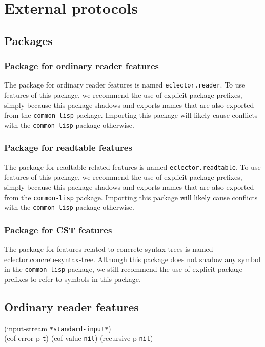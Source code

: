 \chapter{External protocols}

\section{Packages}

\subsection{Package for ordinary reader features}

The package for ordinary reader features is named
\texttt{eclector.reader}.  To use features of this package, we
recommend the use of explicit package prefixes, simply because this
package shadows and exports names that are also exported from the
\texttt{common-lisp} package.  Importing this package will likely
cause conflicts with the \texttt{common-lisp} package otherwise.

\subsection{Package for readtable features}

The package for readtable-related features is named
\texttt{eclector.readtable}.  To use features of this package, we
recommend the use of explicit package prefixes, simply because this
package shadows and exports names that are also exported from the
\texttt{common-lisp} package.  Importing this package will likely
cause conflicts with the \texttt{common-lisp} package otherwise.

\subsection{Package for CST features}

The package for features related to concrete syntax trees is named
eclector.concrete-syntax-tree.  Although this package does not shadow
any symbol in the \texttt{common-lisp} package, we still recommend the
use of explicit package prefixes to refer to symbols in this package.

\section{Ordinary reader features}

 {\optional (input-stream \texttt{*standard-input*})\\
  (eof-error-p \texttt{t})
  (eof-value \texttt{nil})
  (recursive-p \texttt{nil})}

